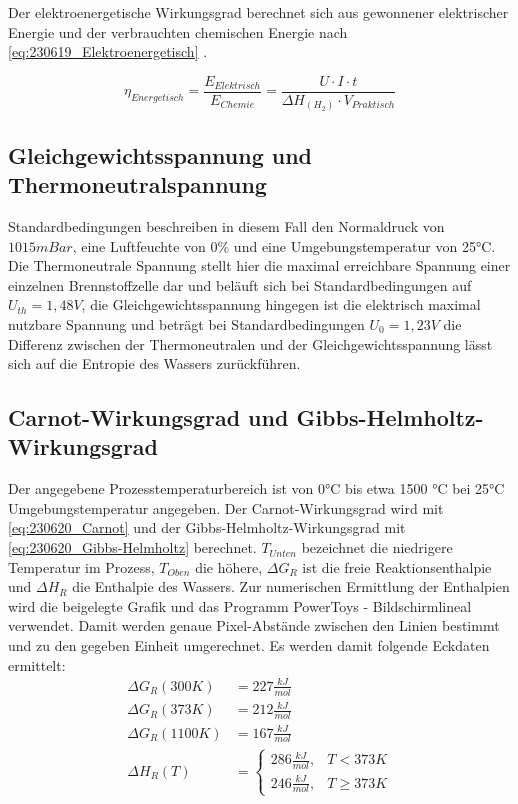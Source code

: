 Der elektroenergetische Wirkungsgrad berechnet sich aus gewonnener elektrischer Energie und der verbrauchten chemischen Energie nach \autoref{eq:230619_Elektroenergetisch} \cite{BZ-Folien}.

\begin{equation}
    \eta_{Energetisch} = \frac{E_{Elektrisch}}{E_{Chemie}} = \frac{U \cdot I \cdot t}{\Delta H_{(H_2)} \cdot V_{Praktisch}}
    \label{eq:230619_Elektroenergetisch}
\end{equation}

\subsection{Gleichgewichtsspannung und Thermoneutralspannung}

Standardbedingungen beschreiben in diesem Fall den Normaldruck von $1015mBar$, eine Luftfeuchte von $0\%$ und eine Umgebungstemperatur von 25°C.
Die Thermoneutrale Spannung stellt hier die maximal erreichbare Spannung einer einzelnen Brennstoffzelle dar und beläuft sich bei Standardbedingungen auf $U_{th} = 1,48V$, 
die Gleichgewichtsspannung hingegen ist die elektrisch maximal nutzbare Spannung und beträgt bei Standardbedingungen $U_0 = 1,23V$ die Differenz zwischen der Thermoneutralen und der Gleichgewichtsspannung lässt sich auf die Entropie des Wassers zurückführen.   

\subsection{Carnot-Wirkungsgrad und Gibbs-Helmholtz-Wirkungsgrad}

Der angegebene Prozesstemperaturbereich ist von 0°C bis etwa 1500 °C bei 25°C
Umgebungstemperatur angegeben.
Der Carnot-Wirkungsgrad wird mit \autoref{eq:230620_Carnot} und der Gibbs-Helmholtz-Wirkungsgrad mit
   \autoref{eq:230620_Gibbs-Helmholtz} berechnet. 
$T_{Unten}$ bezeichnet die niedrigere Temperatur im Prozess, $T_{Oben}$ die höhere, $\Delta G_R$ ist die freie Reaktionsenthalpie und $\Delta H_R$ die Enthalpie des Wassers.
Zur numerischen Ermittlung der Enthalpien wird die beigelegte Grafik und das Programm PowerToys - Bildschirmlineal verwendet.
Damit werden genaue Pixel-Abstände zwischen den Linien bestimmt und zu den gegeben Einheit umgerechnet.
Es werden damit folgende Eckdaten ermittelt:
\begin{align}
    \Delta G_R(300K) &= 227 \frac{kJ}{mol} \nonumber\\
    \Delta G_R(373K) &= 212 \frac{kJ}{mol} \nonumber\\
    \Delta G_R(1100K) &= 167 \frac{kJ}{mol} \nonumber\\
    \Delta H_R(T) &= 
        \begin{cases}
            286 \frac{kJ}{mol}, & T < 373 K \\
            246 \frac{kJ}{mol}, & T \geq 373 K
        \end{cases} \nonumber
\end{align}

